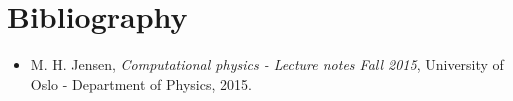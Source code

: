 \documentclass[%
preprint,
 amsmath,amssymb,
 aps,
]{revtex4-1}
\theoremstyle{plain}
\theoremstyle{definition}
\theoremstyle{plain}
\begin{document}


\section{Bibliography}
\begin{itemize}

\item M. H. Jensen, \textit{Computational physics - Lecture notes Fall 2015}, University of Oslo - Department of Physics, 2015. 

\end{itemize}
\end{document}
